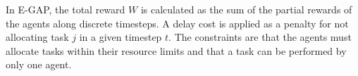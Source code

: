 


In E-GAP, the total reward $W$ is calculated as the sum of the partial rewards of the agents along discrete timesteps. A delay cost is applied as a penalty for not allocating task $j$ in a given timestep $t$. The constraints are that the agents must allocate tasks within their resource limits and that a task can be performed by only one agent.


